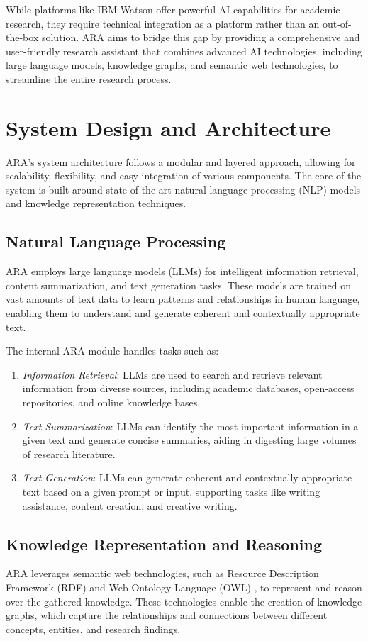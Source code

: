 \documentclass[a4paper,conference]{IEEEtran}
\begin{document}
While platforms like IBM Watson \cite{ibmwatson} offer powerful AI capabilities for academic research, they require technical integration as a platform rather than an out-of-the-box solution. ARA aims to bridge this gap by providing a comprehensive and user-friendly research assistant that combines advanced AI technologies, including large language models, knowledge graphs, and semantic web technologies, to streamline the entire research process.

\section{System Design and Architecture}
ARA's system architecture follows a modular and layered approach, allowing for scalability, flexibility, and easy integration of various components. The core of the system is built around state-of-the-art natural language processing (NLP) models and knowledge representation techniques.

\subsection{Natural Language Processing}
ARA employs large language models (LLMs) for intelligent information retrieval, content summarization, and text generation tasks. These models are trained on vast amounts of text data to learn patterns and relationships in human language, enabling them to understand and generate coherent and contextually appropriate text.

The internal ARA module handles tasks such as:
\begin{enumerate}
\item \textit{Information Retrieval}: LLMs are used to search and retrieve relevant information from diverse sources, including academic databases, open-access repositories, and online knowledge bases.
\item \textit{Text Summarization}: LLMs can identify the most important information in a given text and generate concise summaries, aiding in digesting large volumes of research literature.
\item \textit{Text Generation}: LLMs can generate coherent and contextually appropriate text based on a given prompt or input, supporting tasks like writing assistance, content creation, and creative writing.
\end{enumerate}

\subsection{Knowledge Representation and Reasoning}
ARA leverages semantic web technologies, such as Resource Description Framework (RDF) \cite{rdf} and Web Ontology Language (OWL) \cite{owl}, to represent and reason over the gathered knowledge. These technologies enable the creation of knowledge graphs, which capture the relationships and connections between different concepts, entities, and research findings.
\end{document}
